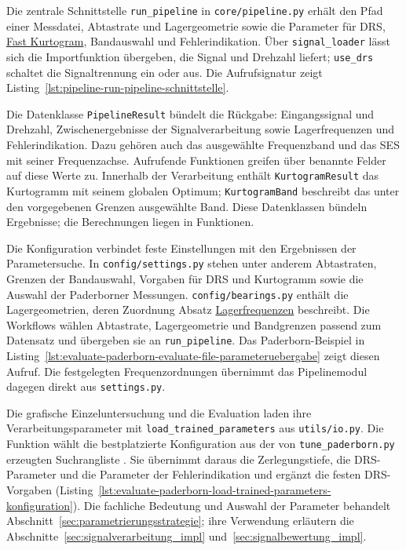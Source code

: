 Die zentrale Schnittstelle \texttt{run\_pipeline} in
\texttt{core/pipeline.py} erhält den Pfad einer Messdatei, Abtastrate und
Lagergeometrie sowie die Parameter für DRS,
\hyperref[par:kurtogramm_fast_kurtogram]{Fast Kurtogram}, Bandauswahl und
Fehlerindikation. Über \texttt{signal\_loader} lässt sich die Importfunktion
übergeben, die Signal und Drehzahl liefert; \texttt{use\_drs} schaltet die
Signaltrennung ein oder aus. Die Aufrufsignatur zeigt
Listing~\ref{lst:pipeline-run-pipeline-schnittstelle}.

Die Datenklasse \texttt{PipelineResult} bündelt die Rückgabe: Eingangssignal
und Drehzahl, Zwischenergebnisse der Signalverarbeitung sowie Lagerfrequenzen
und Fehlerindikation. Dazu gehören auch das ausgewählte Frequenzband und
das SES mit seiner Frequenzachse. Aufrufende Funktionen greifen über
benannte Felder auf diese Werte zu. Innerhalb der Verarbeitung enthält
\texttt{KurtogramResult} das Kurtogramm mit seinem globalen Optimum;
\texttt{KurtogramBand} beschreibt das unter den vorgegebenen Grenzen ausgewählte Band.
Diese Datenklassen bündeln Ergebnisse; die Berechnungen liegen in Funktionen.

Die Konfiguration verbindet feste Einstellungen mit den Ergebnissen der
Parametersuche. In \texttt{config/settings.py} stehen unter anderem
Abtastraten, Grenzen der Bandauswahl, Vorgaben für DRS und Kurtogramm sowie
die Auswahl der Paderborner Messungen. \texttt{config/bearings.py} enthält
die Lagergeometrien, deren Zuordnung Absatz
\hyperref[subsec:lagerfrequenzen_impl]{Lagerfrequenzen} beschreibt.
Die Workflows wählen Abtastrate, Lagergeometrie und Bandgrenzen passend zum
Datensatz und übergeben sie an \texttt{run\_pipeline}.
Das Paderborn-Beispiel in
Listing~\ref{lst:evaluate-paderborn-evaluate-file-parameteruebergabe}
zeigt diesen Aufruf. Die festgelegten Frequenzordnungen übernimmt das
Pipelinemodul dagegen direkt aus \texttt{settings.py}.

Die grafische Einzeluntersuchung und die Evaluation laden ihre
Verarbeitungsparameter mit \texttt{load\_trained\_parameters} aus
\texttt{utils/io.py}. Die Funktion wählt die bestplatzierte Konfiguration
aus der von \texttt{tune\_paderborn.py} erzeugten Suchrangliste
. Sie übernimmt daraus die
Zerlegungstiefe, die DRS-Parameter und die Parameter der Fehlerindikation
und ergänzt die festen DRS-Vorgaben
(Listing~\ref{lst:evaluate-paderborn-load-trained-parameters-konfiguration}).
Die fachliche Bedeutung und Auswahl der Parameter behandelt
Abschnitt~\ref{sec:parametrierungsstrategie}; ihre Verwendung erläutern die
Abschnitte~\ref{sec:signalverarbeitung_impl} und~\ref{sec:signalbewertung_impl}.


